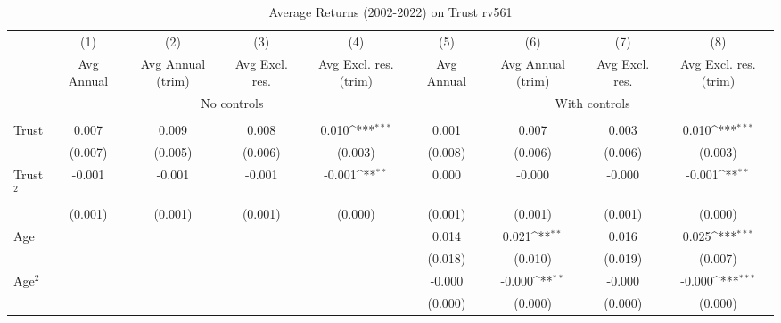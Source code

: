 \begin{table}[htbp]\centering
\def\sym#1{\ifmmode^{#1}\else\(^{#1}\)\fi}
\caption{Average Returns (2002-2022) on Trust rv561}
\begin{tabular}{l*{8}{c}}
\toprule
          &\multicolumn{1}{c}{(1)}&\multicolumn{1}{c}{(2)}&\multicolumn{1}{c}{(3)}&\multicolumn{1}{c}{(4)}&\multicolumn{1}{c}{(5)}&\multicolumn{1}{c}{(6)}&\multicolumn{1}{c}{(7)}&\multicolumn{1}{c}{(8)}\\
          &\multicolumn{1}{c}{Avg Annual}&\multicolumn{1}{c}{Avg Annual (trim)}&\multicolumn{1}{c}{Avg Excl. res.}&\multicolumn{1}{c}{Avg Excl. res. (trim)}&\multicolumn{1}{c}{Avg Annual}&\multicolumn{1}{c}{Avg Annual (trim)}&\multicolumn{1}{c}{Avg Excl. res.}&\multicolumn{1}{c}{Avg Excl. res. (trim)}\\
& \multicolumn{4}{c}{No controls} & \multicolumn{4}{c}{With controls} \\\\ \cmidrule(lr){2-5}\cmidrule(lr){6-9}
Trust     &    0.007         &    0.009         &    0.008         &    0.010\sym{***}&    0.001         &    0.007         &    0.003         &    0.010\sym{***}\\
          &  (0.007)         &  (0.005)         &  (0.006)         &  (0.003)         &  (0.008)         &  (0.006)         &  (0.006)         &  (0.003)         \\
Trust$^{2}$&   -0.001         &   -0.001         &   -0.001         &   -0.001\sym{**} &    0.000         &   -0.000         &   -0.000         &   -0.001\sym{**} \\
          &  (0.001)         &  (0.001)         &  (0.001)         &  (0.000)         &  (0.001)         &  (0.001)         &  (0.001)         &  (0.000)         \\
Age       &                  &                  &                  &                  &    0.014         &    0.021\sym{**} &    0.016         &    0.025\sym{***}\\
          &                  &                  &                  &                  &  (0.018)         &  (0.010)         &  (0.019)         &  (0.007)         \\
Age$^{2}$ &                  &                  &                  &                  &   -0.000         &   -0.000\sym{**} &   -0.000         &   -0.000\sym{***}\\
          &                  &                  &                  &                  &  (0.000)         &  (0.000)         &  (0.000)         &  (0.000)         \\

\end{tabular}
\end{table}
